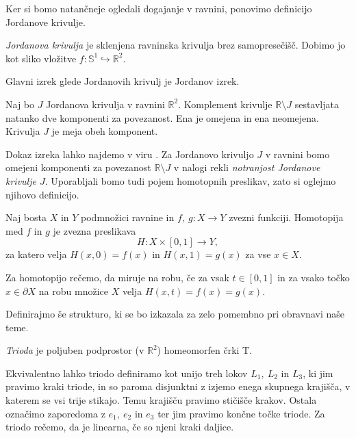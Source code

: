 \documentclass[mat1]{fmfdelo}
\newcommand{\R}{\mathbb R}
\begin{document}
Ker si bomo natančneje ogledali dogajanje v ravnini, ponovimo definicijo Jordanove krivulje.
\begin{definicija}
\emph{Jordanova krivulja} je sklenjena ravninska krivulja brez samopresečišč. Dobimo jo kot sliko vložitve $f\colon \mathbb{S}^1 \hookrightarrow \R^2$.
\end{definicija}
Glavni izrek glede Jordanovih krivulj je Jordanov izrek.
\begin{izrek}
Naj bo $J$ Jordanova krivulja v ravnini $\R^2$. Komplement krivulje $\R \setminus J$ sestavljata natanko dve komponenti za povezanost. Ena je omejena in ena neomejena. Krivulja $J$ je meja obeh komponent.
\end{izrek}
Dokaz izreka lahko najdemo v viru \cite{jordan_wiki}. Za Jordanovo krivuljo $J$ v ravnini bomo omejeni komponenti za povezanost $\R \setminus J$ v nalogi rekli \emph{notranjost Jordanove krivulje $J$}. Uporabljali bomo tudi pojem homotopnih preslikav, zato si oglejmo njihovo definicijo.
\begin{definicija}
Naj bosta $X$ in $Y$ podmnožici ravnine in $f,\ g\colon X \to Y$ zvezni funkciji. Homotopija med  $f$ in $g$ je zvezna preslikava
\[
H\colon X \times [0, 1] \to Y,
\]
 za katero velja $H(x, 0) = f(x)$ in $H(x, 1) = g(x)$ za vse $x\in X$.
\end{definicija}
Za homotopijo rečemo, da miruje na robu, če za vsak $t \in [0, 1]$ in za vsako točko $x \in \partial X$ na robu množice $X$ velja $H(x, t) = f(x) = g(x)$.

Definirajmo še strukturo, ki se bo izkazala za zelo pomembno pri obravnavi naše teme.
\begin{definicija}
\emph{Trioda} je poljuben podprostor (v $\R^2$) homeomorfen črki T.
\end{definicija}
Ekvivalentno lahko triodo definiramo kot unijo treh lokov $L_1,\ L_2$ in $L_3$, ki jim pravimo kraki triode, in so paroma disjunktni z izjemo enega skupnega krajišča, v katerem se vsi trije stikajo. Temu krajišču pravimo stičišče krakov. Ostala označimo zaporedoma z $e_1,\ e_2$ in $e_3$ ter jim pravimo končne točke triode. Za triodo rečemo, da je linearna, če so njeni kraki daljice.
\end{document}
